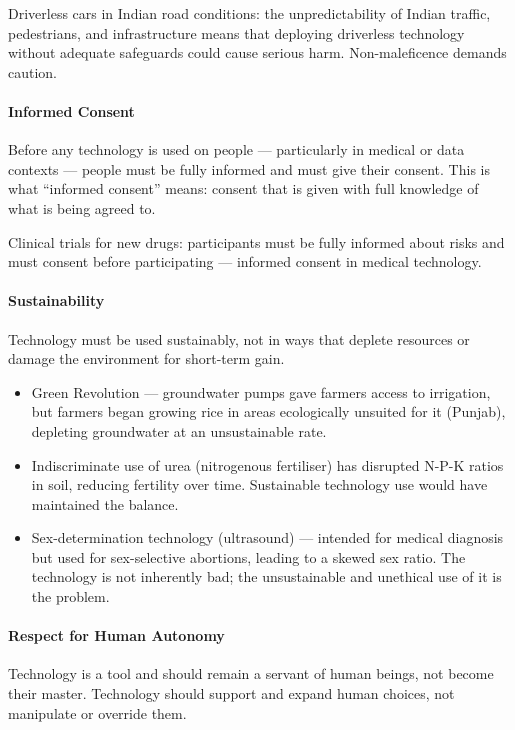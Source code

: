 \begin{ExampleBox}
Driverless cars in Indian road conditions: the unpredictability of Indian traffic, pedestrians, and infrastructure means that deploying driverless technology without adequate safeguards could cause serious harm. Non-maleficence demands caution.
\end{ExampleBox}

\paragraph{Informed Consent} Before any technology is used on people --- particularly in medical or data contexts --- people must be fully informed and must give their consent. This is what ``informed consent'' means: consent that is given with full knowledge of what is being agreed to.

\begin{ExampleBox}
Clinical trials for new drugs: participants must be fully informed about risks and must consent before participating --- informed consent in medical technology.
\end{ExampleBox}

\paragraph{Sustainability} Technology must be used sustainably, not in ways that deplete resources or damage the environment for short-term gain.

\begin{ExampleBox}
\begin{itemize}
\item Green Revolution --- groundwater pumps gave farmers access to irrigation, but farmers began growing rice in areas ecologically unsuited for it (Punjab), depleting groundwater at an unsustainable rate.
\item Indiscriminate use of urea (nitrogenous fertiliser) has disrupted N-P-K ratios in soil, reducing fertility over time. Sustainable technology use would have maintained the balance.
\item Sex-determination technology (ultrasound) --- intended for medical diagnosis but used for sex-selective abortions, leading to a skewed sex ratio. The technology is not inherently bad; the unsustainable and unethical use of it is the problem.
\end{itemize}
\end{ExampleBox}

\paragraph{Respect for Human Autonomy} Technology is a tool and should remain a servant of human beings, not become their master. Technology should support and expand human choices, not manipulate or override them.


